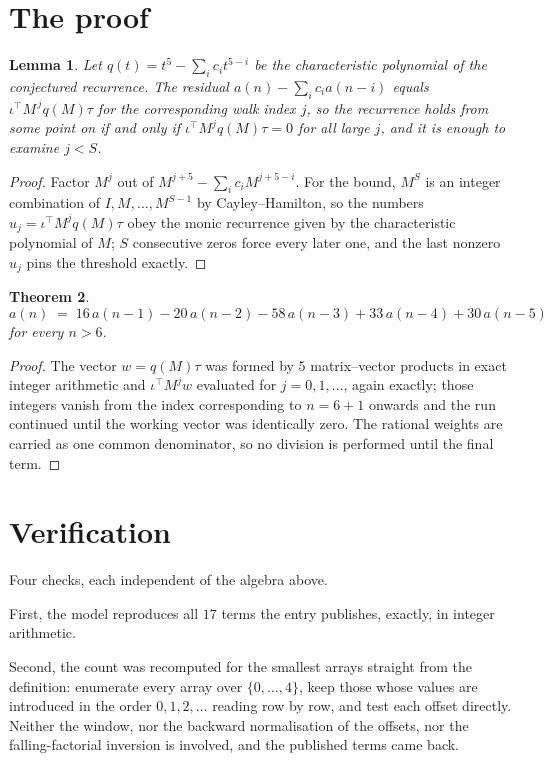 \documentclass[11pt,a4paper]{article}
\theoremstyle{plain}
\newtheorem{theorem}{Theorem}
\newtheorem{lemma}[theorem]{Lemma}
\theoremstyle{definition}
\begin{document}
\section{The proof}

\begin{lemma}\label{lem:crit}
Let $q(t)=t^{5}-\sum_i c_it^{5-i}$ be the characteristic polynomial of the
conjectured recurrence. The residual $a(n)-\sum_ic_ia(n-i)$ equals
$\iota^{\!\top}M^{\,j}q(M)\tau$ for the corresponding walk index $j$, so the recurrence
holds from some point on if and only if $\iota^{\!\top}M^{j}q(M)\tau=0$ for all large $j$,
and it is enough to examine $j<S$.
\end{lemma}

\begin{proof}
Factor $M^{j}$ out of $M^{j+5}-\sum_ic_iM^{j+5-i}$. For the bound, $M^{S}$
is an integer combination of $I,M,\dots,M^{S-1}$ by Cayley--Hamilton, so the numbers
$u_j=\iota^{\!\top}M^{j}q(M)\tau$ obey the monic recurrence given by the characteristic
polynomial of $M$; $S$ consecutive zeros force every later one, and the last nonzero $u_j$
pins the threshold exactly.
\end{proof}

\begin{theorem}
\[
a(n)\;=\;16\,a(n-1) - 20\,a(n-2) - 58\,a(n-3) + 33\,a(n-4) + 30\,a(n-5)
\]
for every $n>6$.
\end{theorem}

\begin{proof}
The vector $w=q(M)\tau$ was formed by $5$ matrix--vector products in exact integer
arithmetic and $\iota^{\!\top}M^{j}w$ evaluated for $j=0,1,\dots$, again exactly; those
integers vanish from the index corresponding to $n=6+1$ onwards and the run continued
until the working vector was identically zero. The rational weights are carried as one common
denominator, so no division is performed until the final term.
\end{proof}

\section{Verification}

Four checks, each independent of the algebra above.

First, the model reproduces all $17$ terms the entry publishes, exactly, in integer
arithmetic.

Second, the count was recomputed for the smallest arrays straight from the definition:
enumerate every array over $\{0,\dots,4\}$, keep those whose values are introduced in the
order $0,1,2,\dots$ reading row by row, and test each offset directly. Neither the window, nor
the backward normalisation of the offsets, nor the falling-factorial inversion is involved, and
the published terms came back.
\end{document}
